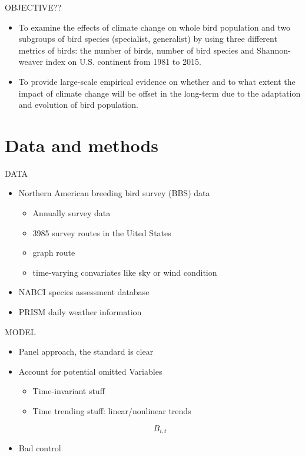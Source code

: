 \documentclass{beamer}
\begin{document}
\begin{frame}{OBJECTIVE??}
  \begin{itemize}
    \item
    To examine the effects of climate change on whole bird population and two subgroups of bird species (specialist, generalist) by using three different metrics of birds: the number of birds, number of bird species and Shannon-weaver index on U.S. continent from 1981 to 2015.
    \item
    To provide large-scale empirical evidence on whether and to what extent the impact of climate change will be offset in the long-term due to the adaptation and evolution of bird population.
  \end{itemize}
\end{frame}

\section{Data and methods}
\begin{frame}{DATA}
  \begin{itemize}
    \item Northern American breeding bird survey (BBS) data
    \begin{itemize}
      \item
      Annually survey data
      \item
      3985 survey routes in the Uited States
      \item
      graph route
      \item
      time-varying convariates like sky or wind condition
    \end{itemize}
    \item NABCI species assessment database
    \item PRISM daily weather information
  \end{itemize}
\end{frame}

\begin{frame}{MODEL}
  \begin{itemize}
    \item Panel approach, the standard is clear
    \item Account for potential omitted Variables
    \begin{itemize}
      \item Time-invariant stuff
      \item Time trending stuff: linear/nonlinear trends
    \end{itemize}
    \begin{equation}
    B_{i,t}
    \end{equation}
    \item Bad control
  \end{itemize}
\end{frame}
\end{document}
